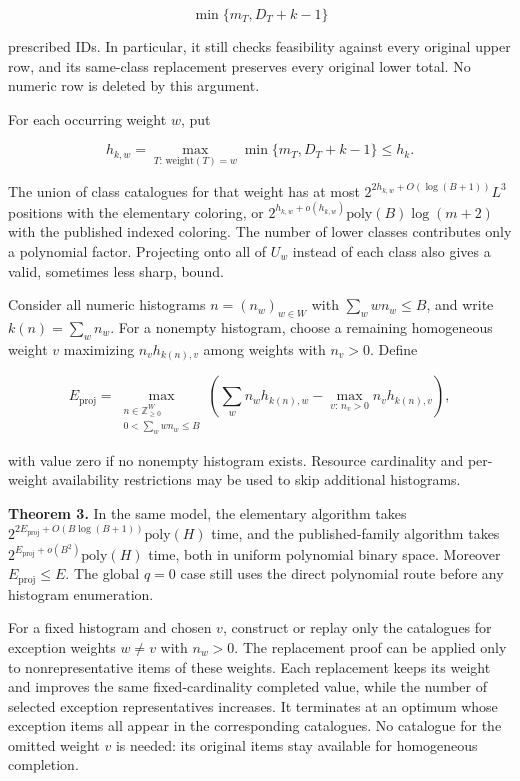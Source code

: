 \[
\min\{m_T,D_T+k-1\}
\tag{DW22}
\]

prescribed IDs. In particular, it still checks feasibility against every original upper row, and its same-class replacement preserves every original lower total. No numeric row is deleted by this argument.

For each occurring weight \(w\), put

\[
h_{k,w}=\max_{T:\,\text{weight}(T)=w}
             \min\{m_T,D_T+k-1\}\le h_k.
\tag{DW23}
\]

The union of class catalogues for that weight has at most \(2^{2h_{k,w}+O(\log(B+1))}L^3\) positions with the elementary coloring, or \(2^{h_{k,w}+o(h_{k,w})}\mathrm{poly}(B)\log(m+2)\) with the published indexed coloring. The number of lower classes contributes only a polynomial factor. Projecting onto all of \(U_w\) instead of each class also gives a valid, sometimes less sharp, bound.

Consider all numeric histograms \(n=(n_w)_{w\in W}\) with \(\sum_w w n_w\le B\), and write \(k(n)=\sum_w n_w\). For a nonempty histogram, choose a remaining homogeneous weight \(v\) maximizing \(n_vh_{k(n),v}\) among weights with \(n_v>0\). Define

\[
E_{\mathrm{proj}}=
\max_{\substack{n\in\mathbb Z_{\ge0}^{W}\\
                 0<\sum_w w n_w\le B}}
\left(\sum_w n_w h_{k(n),w}
       -\max_{v:\,n_v>0}n_v h_{k(n),v}\right),
\tag{DW24}
\]

with value zero if no nonempty histogram exists. Resource cardinality and per-weight availability restrictions may be used to skip additional histograms.

\textbf{Theorem 3.} In the same model, the elementary algorithm takes \(2^{2E_{\mathrm{proj}}+O(B\log(B+1))}\mathrm{poly}(H)\) time, and the published-family algorithm takes \(2^{E_{\mathrm{proj}}+o(B^2)}\mathrm{poly}(H)\) time, both in uniform polynomial binary space. Moreover \(E_{\mathrm{proj}}\le E\). The global \(q=0\) case still uses the direct polynomial route before any histogram enumeration.

For a fixed histogram and chosen \(v\), construct or replay only the catalogues for exception weights \(w\ne v\) with \(n_w>0\). The replacement proof can be applied only to nonrepresentative items of these weights. Each replacement keeps its weight and improves the same fixed-cardinality completed value, while the number of selected exception representatives increases. It terminates at an optimum whose exception items all appear in the corresponding catalogues. No catalogue for the omitted weight \(v\) is needed: its original items stay available for homogeneous completion.

